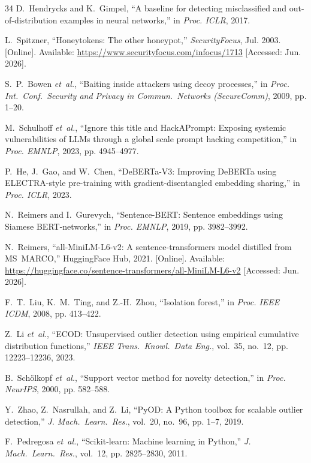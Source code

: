 ﻿\documentclass[conference]{IEEEtran}
\begin{document}
\begin{thebibliography}{34}
D.~Hendrycks and K.~Gimpel, ``A baseline for detecting misclassified and
out-of-distribution examples in neural networks,'' in
\emph{Proc. ICLR}, 2017.

L.~Spitzner, ``Honeytokens: The other honeypot,'' \emph{SecurityFocus},
Jul. 2003.
[Online]. Available: \url{https://www.securityfocus.com/infocus/1713}
[Accessed: Jun. 2026].

S.~P.~Bowen \emph{et~al.}, ``Baiting inside attackers using decoy
processes,'' in \emph{Proc. Int.\ Conf.\ Security and Privacy in Commun.\
Networks (SecureComm)}, 2009, pp. 1--20.

M.~Schulhoff \emph{et~al.}, ``Ignore this title and HackAPrompt: Exposing
systemic vulnerabilities of LLMs through a global scale prompt hacking
competition,'' in \emph{Proc. EMNLP}, 2023, pp. 4945--4977.

P.~He, J.~Gao, and W.~Chen, ``DeBERTa-V3: Improving DeBERTa using
ELECTRA-style pre-training with gradient-disentangled embedding sharing,''
in \emph{Proc. ICLR}, 2023.

N.~Reimers and I.~Gurevych, ``Sentence-BERT: Sentence embeddings using
Siamese BERT-networks,'' in \emph{Proc. EMNLP}, 2019, pp. 3982--3992.

N.~Reimers, ``all-MiniLM-L6-v2: A sentence-transformers model distilled
from MS~MARCO,'' HuggingFace Hub, 2021.
[Online]. Available:
\url{https://huggingface.co/sentence-transformers/all-MiniLM-L6-v2}
[Accessed: Jun. 2026].

F.~T.~Liu, K.~M.~Ting, and Z.-H.~Zhou, ``Isolation forest,'' in
\emph{Proc. IEEE ICDM}, 2008, pp. 413--422.

Z.~Li \emph{et~al.}, ``ECOD: Unsupervised outlier detection using empirical
cumulative distribution functions,'' \emph{IEEE Trans.\ Knowl.\ Data Eng.},
vol.~35, no.~12, pp. 12223--12236, 2023.

B.~Sch\"olkopf \emph{et~al.}, ``Support vector method for novelty
detection,'' in \emph{Proc. NeurIPS}, 2000, pp. 582--588.

Y.~Zhao, Z.~Nasrullah, and Z.~Li, ``PyOD: A Python toolbox for scalable
outlier detection,'' \emph{J. Mach.\ Learn.\ Res.}, vol.~20, no.~96,
pp. 1--7, 2019.

F.~Pedregosa \emph{et~al.}, ``Scikit-learn: Machine learning in Python,''
\emph{J. Mach.\ Learn.\ Res.}, vol.~12, pp. 2825--2830, 2011.


\end{thebibliography}
\end{document}
